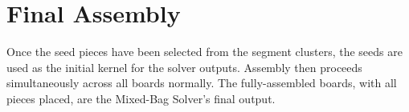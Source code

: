 \section{Final Assembly}

Once the seed pieces have been selected from the segment clusters, the seeds are used as the initial kernel for the solver outputs.  Assembly then proceeds simultaneously across all boards normally.  The fully-assembled boards, with all pieces placed, are the Mixed-Bag Solver's final output.
